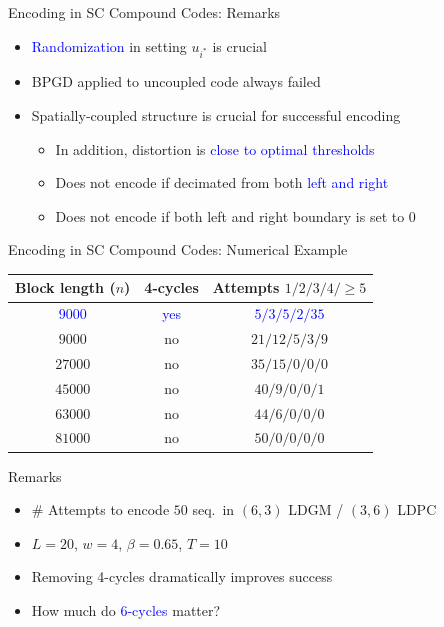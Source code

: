 \documentclass[10pt]{beamer}
\begin{document}
\begin{frame}{Encoding in SC Compound Codes: Remarks}
  \begin{itemize}
  \item \textcolor{blue}{Randomization} in setting $u_{i^*}$ is crucial \vspace{0.3cm}
  \item BPGD applied to uncoupled code \alert{always failed} \vspace{0.3cm}
  \item \alert{Spatially-coupled structure} is crucial for successful encoding \vspace{0.15cm}
    \begin{itemize}
    \item In addition, distortion is \textcolor{blue}{close to optimal thresholds} \vspace{0.2cm}
    \item \alert{Does not encode} if decimated from both \textcolor{blue}{left and right}\vspace{0.2cm}
    \item \alert{Does not encode} if both left and right boundary is set to 0 \vspace{0.2cm}
    \end{itemize}
  \end{itemize}
\end{frame}

\begin{frame}{Encoding in SC Compound Codes: Numerical Example}
  \begin{center}
    \begin{tabular}{|c|c|c|}
      \hline
      Block length ($n$) & 4-cycles & Attempts $1/2/3/4/\geq 5$  \\
      \hline
      \textcolor{blue}{$9000$} & \textcolor{blue}{yes} & \textcolor{blue}{$5/3/5/2/35$} \\
      $9000$ & no & $21/12/5/3/9$ \\
      $27000$ & no & $35/15/0/0/0$ \\
      $45000$ & no & $40/9/0/0/1$ \\
      $63000$ & no & $44/6/0/0/0$ \\
      \alert{$81000$} & \alert{no} & \alert{$50/0/0/0/0$}\\ 
      \hline  
    \end{tabular}
  \end{center}
  \begin{block}{Remarks}
    \begin{itemize}
    \item \# Attempts to encode $50$ seq.~in $(6,3)$ LDGM / $(3,6)$ LDPC
    \item $L=20$, $w=4$, $\beta=0.65$, $T=10$
    \item Removing \alert{4-cycles} dramatically improves success
    \item How much do \textcolor{blue}{6-cycles} matter?
    \end{itemize}
  \end{block}
\end{frame}
\end{document}
